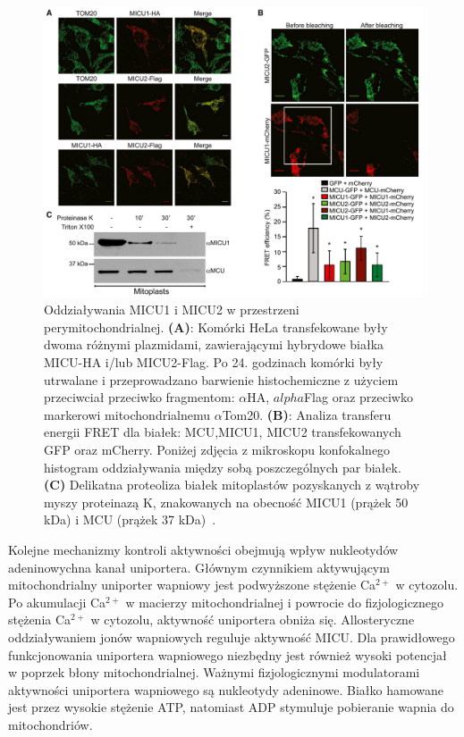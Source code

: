 \begin{figure}[ht]
	\centering
	\includegraphics[width=1\textwidth]{rysunki/rozdzial_1/micu1micu2.png}
	\caption[Oddziaływanie pomiędzy MICU1 i MICU2]{Oddziaływania MICU1 i MICU2 w przestrzeni perymitochondrialnej. \textbf{(A)}: Komórki HeLa transfekowane były dwoma różnymi plazmidami, zawierającymi hybrydowe białka MICU-HA i/lub MICU2-Flag. Po 24. godzinach komórki były utrwalane i przeprowadzano barwienie histochemiczne z użyciem przeciwciał przeciwko fragmentom: $\alpha$HA, $alpha$Flag oraz przeciwko markerowi mitochondrialnemu $\alpha$Tom20. \textbf{(B)}: Analiza transferu energii FRET dla białek: MCU,MICU1, MICU2 transfekowanych GFP oraz mCherry. Poniżej zdjęcia z mikroskopu konfokalnego histogram oddziaływania między sobą poszczególnych par białek. \textbf{(C)} Delikatna proteoliza białek mitoplastów pozyskanych z wątroby myszy proteinazą K, znakowanych na obecność MICU1 (prążek 50 kDa) i MCU (prążek 37 kDa)~\cite{Patron2014}.}
	\label{fig:micu2}
\end{figure}

Kolejne mechanizmy kontroli aktywności obejmują wpływ nukleotydów adeninowychna kanał uniportera. Głównym czynnikiem aktywującym mitochondrialny uniporter wapniowy jest podwyższone stężenie Ca$^{2+}$ w cytozolu. Po akumulacji Ca$^{2+}$ w macierzy mitochondrialnej i powrocie do fizjologicznego stężenia Ca$^{2+}$ w cytozolu, aktywność uniportera obniża się. Allosteryczne oddziaływaniem jonów wapniowych reguluje aktywność MICU. Dla prawidłowego funkcjonowania uniportera wapniowego niezbędny jest również wysoki potencjał w poprzek błony mitochondrialnej. Ważnymi fizjologicznymi modulatorami aktywności uniportera wapniowego są nukleotydy adeninowe. Białko hamowane jest przez wysokie stężenie ATP, natomiast ADP stymuluje pobieranie wapnia do mitochondriów.

